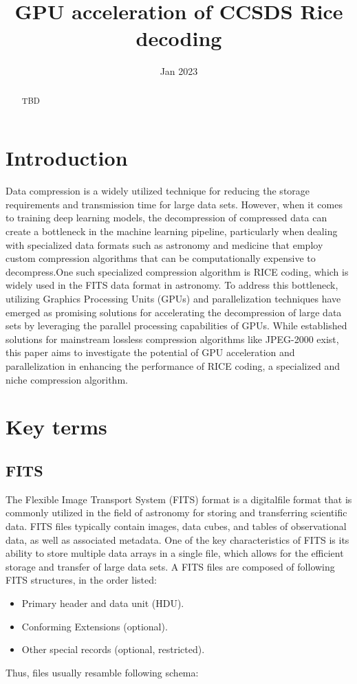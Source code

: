 \documentclass[licencjacka,en]{pracamgr}
\title{GPU acceleration of CCSDS Rice decoding}
\date{Jan 2023}
\begin{document}
\maketitle

\begin{abstract}
	TBD
\end{abstract}

\tableofcontents

\chapter*{Introduction}
Data compression is a widely utilized technique for reducing the storage requirements
and transmission time for large data sets.  However, when it comes to training deep
learning models, the decompression of compressed data can create a bottleneck in the machine
learning pipeline,  particularly when dealing with specialized data formats such as astronomy
and medicine that employ custom compression algorithms that can be computationally
expensive to decompress.One such specialized compression algorithm is RICE coding, which is
widely used in the FITS data format in astronomy. To address this bottleneck, utilizing
Graphics Processing Units (GPUs) and parallelization techniques have emerged as promising
solutions for accelerating the decompression of large data sets by leveraging the parallel
processing capabilities of GPUs. While established solutions for mainstream lossless compression
algorithms like JPEG-2000 exist, this paper aims to investigate the potential of GPU acceleration
and parallelization in enhancing the performance of RICE coding, a specialized and niche
compression algorithm.

\chapter{Key terms}\label{r:pojecia}

\section{FITS}
The Flexible Image Transport System (FITS) format is a digitalfile format that is commonly
utilized in the field of astronomy for storing and transferring scientific data. FITS files
typically contain images, data cubes, and tables of observational data, as well as associated metadata.
One of the key characteristics of FITS is its ability to store multiple data arrays in a single file, which
allows for the efficient storage and transfer of large data sets.
A FITS files are composed of following FITS structures, in the order listed:
\begin{itemize}
	\item Primary header and data unit (HDU).
	\item Conforming Extensions (optional).
	\item Other special records (optional, restricted).
\end{itemize}
Thus, files usually resamble following schema:
\end{document}
